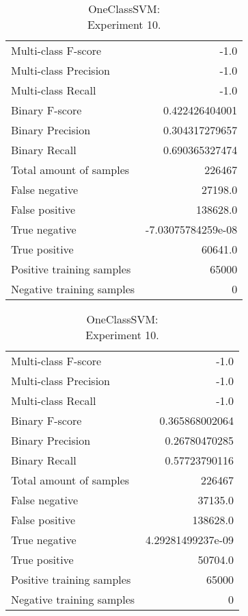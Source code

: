 \begin{table}[H]
\begin{minipage}{0.5\textwidth}

\caption{OneClassSVM: \\Experiment 9.}

\centering
\begin{tabular}{l r}
\toprule
Multi-class F-score & -1.0 \\
Multi-class Precision & -1.0 \\
Multi-class Recall & -1.0 \\
\midrule
Binary F-score & 0.422426404001 \\
Binary Precision & 0.304317279657 \\
Binary Recall & 0.690365327474 \\
\midrule
Total amount of samples & 226467 \\
False negative & 27198.0 \\
False positive & 138628.0 \\
True negative & -7.03075784259e-08 \\
True positive & 60641.0 \\
\midrule
Positive training samples & 65000 \\
Negative training samples & 0 \\
\bottomrule
\end{tabular}
\end{minipage}
\hfillx
\begin{minipage}{0.5\textwidth}

\caption{OneClassSVM: \\Experiment 10.}

\centering
\begin{tabular}{l r}
\toprule
Multi-class F-score & -1.0 \\
Multi-class Precision & -1.0 \\
Multi-class Recall & -1.0 \\
\midrule
Binary F-score & 0.365868002064 \\
Binary Precision & 0.26780470285 \\
Binary Recall & 0.57723790116 \\
\midrule
Total amount of samples & 226467 \\
False negative & 37135.0 \\
False positive & 138628.0 \\
True negative & 4.29281499237e-09 \\
True positive & 50704.0 \\
\midrule
Positive training samples & 65000 \\
Negative training samples & 0 \\
\bottomrule
\end{tabular}
\end{minipage}
\end{table}
